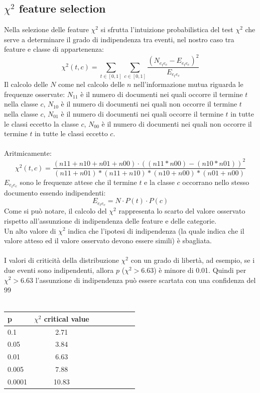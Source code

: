 \documentclass{article}
\theoremstyle{plain}
\theoremstyle{definition}
\begin{document}
\subsection{$\chi^2$ feature selection}
Nella selezione delle feature $\chi^2$ si sfrutta l'intuizione probabilistica del test $\chi^2$ che serve a determinare il grado di indipendenza tra eventi, nel nostro caso tra feature e classe di appartenenza:
$$\chi^2(t,c)=\sum_{t \in [0,1]} \sum_{c \in [0,1]} \frac{(N_{e_{t}e_{c}} - E_{e_{t}e_{c}})^2}{E_{e_{t}e_{c}}} $$  
Il calcolo delle $N$ come nel calcolo delle $n$ nell'informazione mutua riguarda le frequenze osservate: $N_{11}$ è il numero di documenti nei quali occorre il termine $t$ nella classe $c$, $N_{10}$ è il numero di documenti nei quali non occorre il termine $t$ nella classe $c$, $N_{01}$ è il numero di documenti nei quali occorre il termine $t$ in tutte le classi eccetto la classe $c$, $N_{00}$ è il numero di documenti nei quali non occorre il termine $t$ in tutte le classi eccetto $c$.
\\ 
\\
Aritmicamente:
$$\chi^2(t,c)=\frac{(n11+n10+n01+n00) \cdot ((n11*n00)-(n10*n01))^2}{(n11+n01)*(n11+n10)*(n10+n00)*(n01+n00)}
$$
$E_{e_{t}e_{c}}$ sono le frequenze attese che il termine $t$ e la classe $c$ occorrano nello stesso documento essendo indipendenti:
$$E_{e_{t}e_{c}} = N \cdot P(t) \cdot P(c)$$
Come si può notare, il calcolo del $\chi^2$ rappresenta lo scarto del valore osservato rispetto all'assunzione di indipendenza delle feature e delle categorie. 
\\
Un alto valore di $\chi^2$ indica che l'ipotesi di indipendenza (la quale indica che il valore atteso ed il valore osservato devono essere simili) è sbagliata.
\\
\\
I valori di criticità della distribuzione $\chi^2$ con un grado di libertà, ad esempio, se i due eventi sono indipendenti, allora $p$ ($\chi^2>6.63$) è minore di 0.01. Quindi per $\chi^2>6.63$ l'assunzione di indipendenza può essere scartata con una confidenza del 99%
\\
\\
\begin{tabular}{l*{6}{c}r}
p  & $\chi^2$ critical value \\
\hline
0.1 & 2.71 \\
0.05 & 3.84 \\
0.01 & 6.63 \\
0.005 & 7.88 \\
0.0001 & 10.83 \\

\end{tabular}
\end{document}
